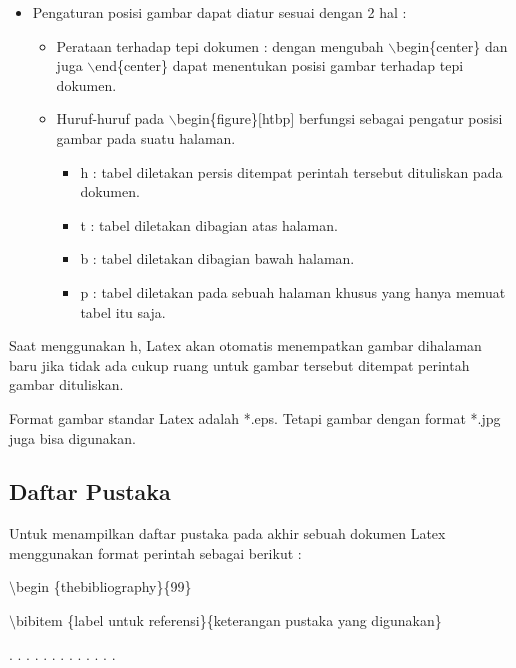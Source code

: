 \begin{itemize}
\item Pengaturan posisi gambar dapat diatur sesuai dengan 2 hal :
\begin{itemize}
\item Perataan terhadap tepi dokumen : dengan mengubah 
$\backslash$begin\{center\} dan juga $\backslash$end\{center\} dapat menentukan posisi gambar terhadap tepi dokumen.
\item Huruf-huruf pada $\backslash$begin\{figure\}$[$htbp$]$ berfungsi sebagai pengatur posisi gambar pada suatu halaman.
\begin{itemize}
\item h : tabel diletakan persis ditempat perintah tersebut dituliskan pada dokumen.
\item t : tabel diletakan dibagian atas halaman.
\item b : tabel diletakan dibagian bawah halaman.
\item p : tabel diletakan pada sebuah halaman khusus yang hanya memuat tabel itu saja.
\end{itemize}
\end{itemize}
\end{itemize}
Saat menggunakan h, Latex akan otomatis menempatkan gambar dihalaman baru jika tidak ada cukup ruang untuk gambar tersebut ditempat perintah gambar dituliskan.\par \vspace{12pt}

Format gambar standar Latex adalah *.eps. Tetapi gambar dengan format *.jpg juga bisa digunakan.\par \vspace{12pt}

\subsection {Daftar Pustaka}\par \vspace{12pt}

Untuk menampilkan daftar pustaka pada akhir sebuah dokumen Latex menggunakan format perintah sebagai berikut :\par \vspace{12pt}

$\setminus$begin \{thebibliography\}\{99\}
\par \vspace{12pt}
$\setminus$bibitem \{label untuk referensi\}\{keterangan pustaka yang digunakan\}
\par \vspace{12pt}
. . . . . . . . . . . . .

